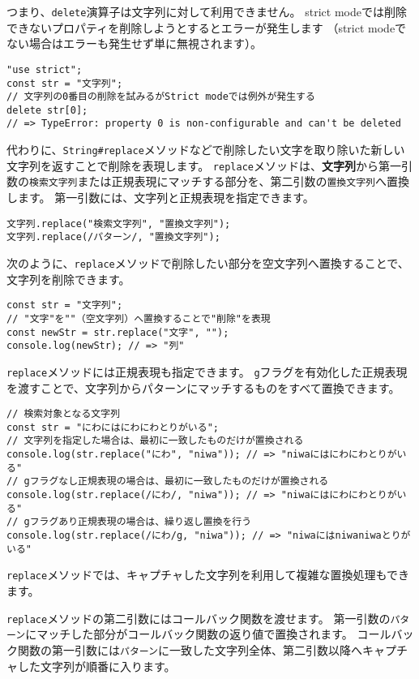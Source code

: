 つまり、\texttt{delete}演算子は文字列に対して利用できません。
strict
modeでは削除できないプロパティを削除しようとするとエラーが発生します
（strict modeでない場合はエラーも発生せず単に無視されます）。

\begin{lstlisting}
"use strict";
const str = "文字列";
// 文字列の0番目の削除を試みるがStrict modeでは例外が発生する
delete str[0]; 
// => TypeError: property 0 is non-configurable and can't be deleted
\end{lstlisting}

代わりに、\texttt{String\#replace}メソッドなどで削除したい文字を取り除いた新しい文字列を返すことで削除を表現します。
\texttt{replace}メソッドは、\textbf{文字列}から第一引数の\texttt{検索文字列}または正規表現にマッチする部分を、第二引数の\texttt{置換文字列}へ置換します。
第一引数には、文字列と正規表現を指定できます。

\begin{lstlisting}
文字列.replace("検索文字列", "置換文字列");
文字列.replace(/パターン/, "置換文字列");
\end{lstlisting}

次のように、\texttt{replace}メソッドで削除したい部分を空文字列へ置換することで、文字列を削除できます。

\begin{lstlisting}
const str = "文字列";
// "文字"を""（空文字列）へ置換することで"削除"を表現
const newStr = str.replace("文字", "");
console.log(newStr); // => "列"
\end{lstlisting}

\texttt{replace}メソッドには正規表現も指定できます。
\texttt{g}フラグを有効化した正規表現を渡すことで、文字列からパターンにマッチするものをすべて置換できます。

\begin{lstlisting}
// 検索対象となる文字列
const str = "にわにはにわにわとりがいる";
// 文字列を指定した場合は、最初に一致したものだけが置換される
console.log(str.replace("にわ", "niwa")); // => "niwaにはにわにわとりがいる"
// gフラグなし正規表現の場合は、最初に一致したものだけが置換される
console.log(str.replace(/にわ/, "niwa")); // => "niwaにはにわにわとりがいる"
// gフラグあり正規表現の場合は、繰り返し置換を行う
console.log(str.replace(/にわ/g, "niwa")); // => "niwaにはniwaniwaとりがいる"
\end{lstlisting}

\texttt{replace}メソッドでは、キャプチャした文字列を利用して複雑な置換処理もできます。

\texttt{replace}メソッドの第二引数にはコールバック関数を渡せます。
第一引数の\texttt{パターン}にマッチした部分がコールバック関数の返り値で置換されます。
コールバック関数の第一引数には\texttt{パターン}に一致した文字列全体、第二引数以降へキャプチャした文字列が順番に入ります。

